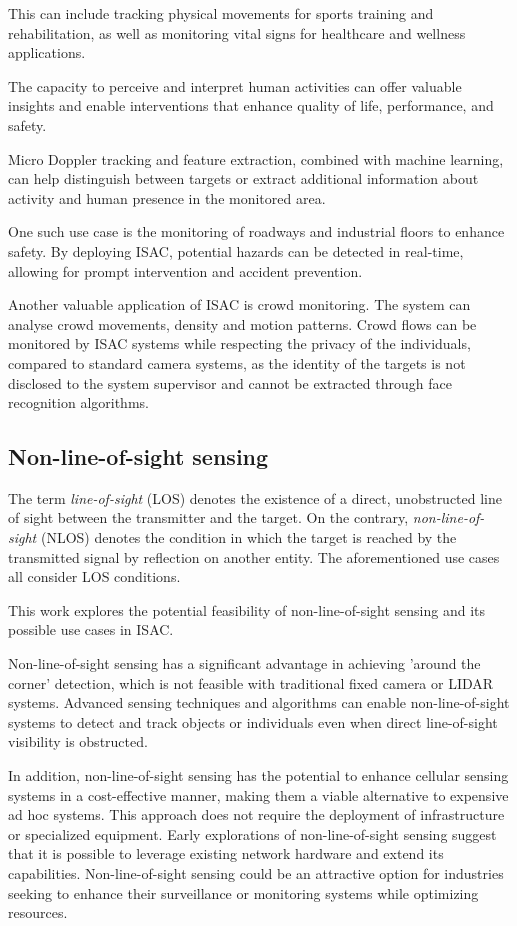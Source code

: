 	This can include tracking physical movements for sports training and rehabilitation, as well as monitoring vital signs for healthcare and wellness applications. 
	
	The capacity to perceive and interpret human activities can offer valuable insights and enable interventions that enhance quality of life, performance, and safety.
	
	Micro Doppler tracking and feature extraction, combined with machine learning, can help distinguish between targets or extract additional information about activity and human presence in the monitored area.
	
	One such use case is the monitoring of roadways and industrial floors to enhance safety. By deploying ISAC, potential hazards can be detected in real-time, allowing for prompt intervention and accident prevention. 
	
	Another valuable application of ISAC is crowd monitoring. 
	The system can analyse crowd movements, density and motion patterns. 
	Crowd flows can be monitored by ISAC systems while respecting the privacy of the individuals, compared to standard camera systems, as the identity of the targets is not disclosed to the system supervisor and cannot be extracted through face recognition algorithms.

	
	\subsection{Non-line-of-sight sensing}
	
	The term \textit{line-of-sight} (LOS)  denotes the existence of a direct, unobstructed line of sight between the transmitter and the target. On the contrary, \textit{non-line-of-sight} (NLOS) denotes the condition in which the target is reached by the transmitted signal by reflection on another entity. The aforementioned use cases all consider LOS conditions. 
	
	This work explores the potential feasibility of non-line-of-sight sensing and its possible use cases in ISAC.
	
	Non-line-of-sight sensing has a significant advantage in achieving 'around the corner' detection, which is not feasible with traditional fixed camera or LIDAR systems. Advanced sensing techniques and algorithms can enable non-line-of-sight systems to detect and track objects or individuals even when direct line-of-sight visibility is obstructed.
	
	In addition, non-line-of-sight sensing has the potential to enhance cellular sensing systems in a cost-effective manner, making them a viable alternative to expensive ad hoc systems. This approach does not require the deployment of infrastructure or specialized equipment. Early explorations of non-line-of-sight sensing suggest that it is possible to leverage existing network hardware and extend its capabilities. Non-line-of-sight sensing could be an attractive option for industries seeking to enhance their surveillance or monitoring systems while optimizing resources.
	
